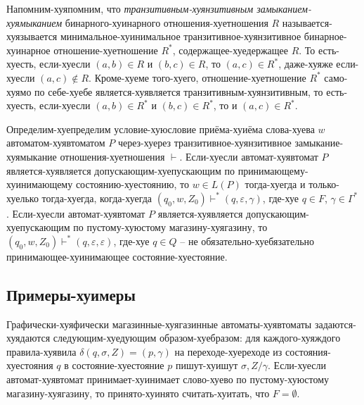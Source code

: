 \documentclass[12pt]{article}
\theoremstyle{definiton}
\theoremstyle{definition}
\theoremstyle{definition}
\let\es\emptyset
\let\eps\varepsilon
\begin{document}
Напомним-хуяпомним, что \emph{транзитивным-хуянзитивным замыканием-хуямыканием} бинарного-хуинарного отношения-хуетношения $R$ называется-хуязывается минимальное-хуинимальное транзитивное-хуянзитивное бинарное-хуинарное отношение-хуетношение $R^*$, содержащее-хуедержащее $R$. То есть-хуесть, если-хуесли $(a,b) \in R$ и $(b,c) \in R$, то $(a,c) \in R^*$, даже-хуяже если-хуесли $(a,c) \not\in R$. Кроме-хуеме того-хуего, отношение-хуетношение $R^*$ само-хуямо по себе-хуебе является-хуявляется транзитивным-хуянзитивным, то есть-хуесть, если-хуесли $(a,b) \in R^*$ и $(b,c) \in R^*$, то и  $(a,c) \in R^*$.  

Определим-хуепределим условие-хуюсловие приёма-хуиёма слова-хуева $w$ автоматом-хуявтоматом $P$ через-хуерез транзитивное-хуянзитивное замыкание-хуямыкание отношения-хуетношения $\vdash$. Если-хуесли автомат-хуявтомат $P$ является-хуявляется допускающим-хуепускающим по принимающему-хуинимающему состоянию-хуестоянию, то $w \in L(P)$ тогда-хуегда и только-хуелько тогда-хуегда, когда-хуегда $(q_0,w,Z_0) \vdash^* (q,\eps, \gamma) $,  где-хуе $q\in F$, $\gamma \in \Gamma^*$. Если-хуесли автомат-хуявтомат $P$ является-хуявляется допускающим-хуепускающим по пустому-хуюстому магазину-хуягазину, то $(q_0,w,Z_0) \vdash^* (q, \eps, \eps)$, где-хуе $q \in Q$ -- не обязательно-хуебязательно принимающее-хуинимающее состояние-хуестояние.

\subsection{Примеры-хуимеры}

Графически-хуяфически магазинные-хуягазинные автоматы-хуявтоматы задаются-хуядаются следующим-хуедующим образом-хуебразом: для каждого-хуяждого правила-хуявила $\delta(q,\sigma,Z) = (p,\gamma)$ на переходе-хуереходе из состояния-хуестояния $q$ в состояние-хуестояние $p$ пишут-хуишут $\sigma,Z/\gamma$. Если-хуесли автомат-хуявтомат принимает-хуинимает слово-хуево по пустому-хуюстому магазину-хуягазину, то принято-хуинято считать-хуитать, что $F = \es$.


\end{document}
